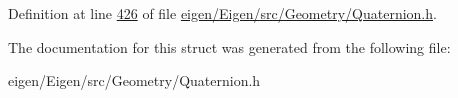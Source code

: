 Definition at line \hyperlink{eigen_2_eigen_2src_2_geometry_2_quaternion_8h_source_l00426}{426} of file \hyperlink{eigen_2_eigen_2src_2_geometry_2_quaternion_8h_source}{eigen/\+Eigen/src/\+Geometry/\+Quaternion.\+h}.



The documentation for this struct was generated from the following file\+:\begin{DoxyCompactItemize}
\item 
eigen/\+Eigen/src/\+Geometry/\+Quaternion.\+h\end{DoxyCompactItemize}
